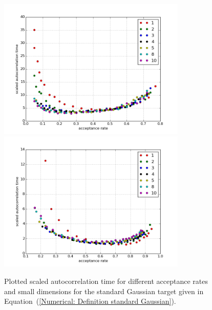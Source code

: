 \begin{figure}%
 \begin{center} 
  \includegraphics[width=0.8\textwidth]{RWM_convergenceDiagramm_2}
  \vspace*{1mm}
  \label{fig:OptimalScaling-RWM-small-dimensions}
  \vspace*{3mm}
  \includegraphics[width=0.8\textwidth]{MALA_convergenceDiagramm_2}
  \vspace*{1mm}
  \label{fig:OptimalScaling-MALA-small-dimensions}
 \end{center}
  \caption{Plotted scaled autocorrelation time for different acceptance rates and small dimensions for the standard Gaussian target given in Equation~(\ref{Numerical: Definition standard Gaussian}).}
  \label{fig:OptimalScaling for RWM and MALA in small dimensions}
\end{figure}


